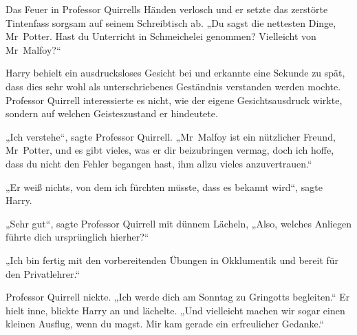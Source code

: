 Das Feuer in Professor Quirrells Händen verlosch und er setzte das zerstörte Tintenfass sorgsam auf seinem Schreibtisch ab.
„Du sagst die nettesten Dinge, Mr~Potter. Hast du Unterricht in Schmeichelei genommen? Vielleicht von Mr~Malfoy?“

Harry behielt ein ausdrucksloses Gesicht bei und erkannte eine Sekunde zu spät, dass dies sehr wohl als unterschriebenes Geständnis verstanden werden mochte. Professor Quirrell interessierte es nicht, wie der eigene Gesichtsausdruck wirkte, sondern auf welchen Geisteszustand er hindeutete.

„Ich verstehe“, sagte Professor Quirrell.
„Mr~Malfoy ist ein nützlicher Freund, Mr~Potter, und es gibt vieles, was er dir beizubringen vermag, doch ich hoffe, dass du nicht den Fehler begangen hast, ihm allzu vieles anzuvertrauen.“

„Er weiß nichts, von dem ich fürchten müsste, dass es bekannt wird“, sagte Harry.

„Sehr gut“, sagte Professor Quirrell mit dünnem Lächeln,
„Also, welches Anliegen führte dich ursprünglich hierher?“

„Ich bin fertig mit den vorbereitenden Übungen in Okklumentik und bereit für den Privatlehrer.“

Professor Quirrell nickte.
„Ich werde dich am Sonntag zu Gringotts begleiten.“ Er hielt inne, blickte Harry an und lächelte.
„Und vielleicht machen wir sogar einen kleinen Ausflug, wenn du magst. Mir kam gerade ein erfreulicher Gedanke.“

